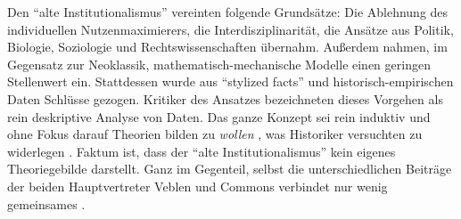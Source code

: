 Den "`alte Institutionalismus"' vereinten folgende Grundsätze: Die Ablehnung des individuellen Nutzenmaximierers, die Interdisziplinarität, die Ansätze aus Politik, Biologie, Soziologie und Rechtswissenschaften übernahm. Außerdem nahmen, im Gegensatz zur Neoklassik, mathematisch-mechanische Modelle einen geringen Stellenwert ein. Stattdessen wurde aus "`stylized facts"' und historisch-empirischen Daten Schlüsse gezogen. Kritiker des Ansatzes bezeichneten dieses Vorgehen als rein deskriptive Analyse von Daten. Das ganze Konzept sei rein induktiv und ohne Fokus darauf Theorien bilden zu \textit{wollen} \parencite[S. 703]{Blaug1962}, was Historiker versuchten zu widerlegen \parencite[S. 424]{Hodgson1998b} \parencite[S. 174]{Hodgson1998}. Faktum ist, dass der "`alte Institutionalismus"' kein eigenes Theoriegebilde darstellt. Ganz im Gegenteil, selbst die unterschiedlichen Beiträge der beiden Hauptvertreter Veblen und Commons verbindet nur wenig gemeinsames \parencite[S. 701f.]{Blaug1962}. 

